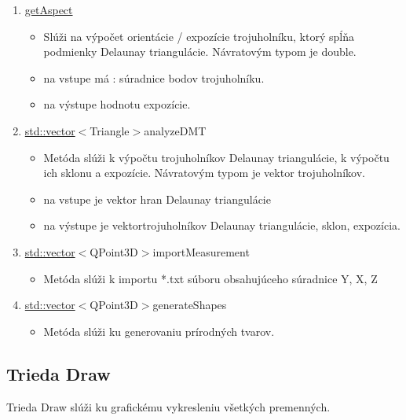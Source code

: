 \documentclass[12pt]{article}
\begin{document}
\begin{enumerate}
\item[] \underline{getAspect}
\begin{itemize}
\item Slúži na výpočet orientácie / expozície trojuholníku, ktorý spĺňa podmienky Delaunay triangulácie. Návratovým typom je double.
\item na vstupe má : súradnice bodov trojuholníku.
\item na výstupe hodnotu expozície.
\end{itemize}

\item[] \underline {std::vector}$<${Triangle}$>${analyzeDMT}
\begin{itemize}
\item Metóda slúži k výpočtu trojuholníkov Delaunay triangulácie, k výpočtu ich sklonu a expozície. Návratovým typom je vektor trojuholníkov.
\item na vstupe je vektor hran Delaunay triangulácie
\item na výstupe je vektortrojuholníkov Delaunay triangulácie, sklon, expozícia.
\end{itemize}

\item[] \underline {std::vector}$<${QPoint3D}$>${importMeasurement}
\begin{itemize}
\item Metóda slúži k importu *.txt súboru obsahujúceho súradnice Y, X, Z 
\end{itemize}

\item[] \underline {std::vector}$<${QPoint3D}$>${generateShapes}
\begin{itemize}
\item Metóda slúži ku generovaniu prírodných tvarov.
\end{itemize}

\end{enumerate}

\subsection{Trieda Draw}
Trieda Draw slúži ku grafickému vykresleniu všetkých premenných.
\end{document}

